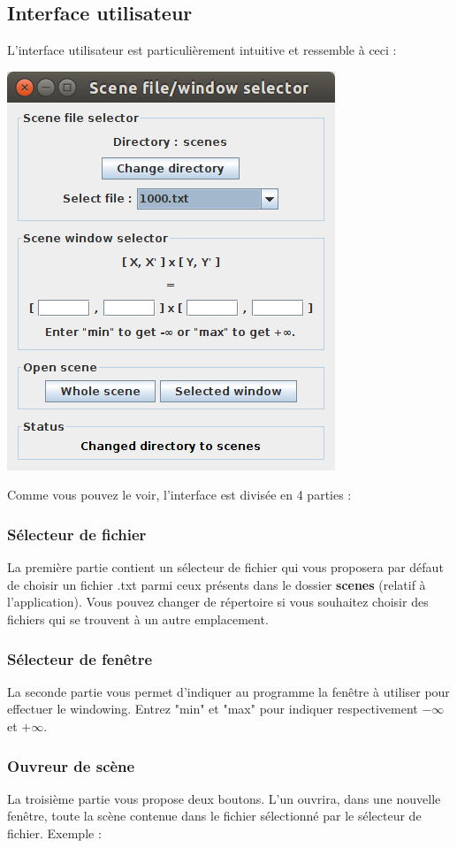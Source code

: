 \documentclass[10pt,a4paper]{article}
\begin{document}
\subsection{Interface utilisateur}
L'interface utilisateur est particulièrement intuitive et ressemble à ceci :

\centerline{\includegraphics[scale=0.5]{images/ui.png}}

Comme vous pouvez le voir, l'interface est divisée en 4 parties :
\subsubsection{Sélecteur de fichier}
La première partie contient un sélecteur de fichier qui vous proposera par défaut de choisir un fichier .txt parmi ceux présents dans le dossier \textbf{scenes} (relatif à l'application). Vous pouvez changer de répertoire si vous souhaitez choisir des fichiers qui se trouvent à un autre emplacement.

\subsubsection{Sélecteur de fenêtre}
La seconde partie vous permet d'indiquer au programme la fenêtre à utiliser pour effectuer le windowing. Entrez "min" et "max" pour indiquer respectivement $-\infty$ et $+\infty$.

\subsubsection{Ouvreur de scène}
La troisième partie vous propose deux boutons. L'un ouvrira, dans une nouvelle fenêtre, toute la scène contenue dans le fichier sélectionné par le sélecteur de fichier. Exemple :
\end{document}
